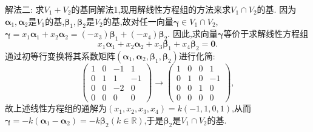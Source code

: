 \documentclass[../../main.tex]{subfiles}
\begin{document}
\begin{solution}
{\color{blue}解法二:} 求\(V_1 + V_2\)的基同解法1,现用解线性方程组的方法来求\(V_1\cap V_2\)的基. 因为\(\boldsymbol{\alpha}_1,\boldsymbol{\alpha}_2\)是\(V_1\)的基,\(\boldsymbol{\beta}_1,\boldsymbol{\beta}_2\)是\(V_2\)的基,故对任一向量\(\boldsymbol{\gamma}\in V_1\cap V_2\),\(\boldsymbol{\gamma}=x_1\boldsymbol{\alpha}_1 + x_2\boldsymbol{\alpha}_2=(-x_3)\boldsymbol{\beta}_1 + (-x_4)\boldsymbol{\beta}_2\). 因此,求向量\(\boldsymbol{\gamma}\)等价于求解线性方程组
\[
x_1\boldsymbol{\alpha}_1 + x_2\boldsymbol{\alpha}_2 + x_3\boldsymbol{\beta}_1 + x_4\boldsymbol{\beta}_2=\boldsymbol{0}.
\]
通过初等行变换将其系数矩阵\((\boldsymbol{\alpha}_1,\boldsymbol{\alpha}_2,\boldsymbol{\beta}_1,\boldsymbol{\beta}_2)\)进行化简:
\[
\begin{pmatrix}
1&0&-1&1\\
0&1&1&-1\\
0&0&-2&0\\
0&0&0&0
\end{pmatrix}\to
\begin{pmatrix}
1&0&0&1\\
0&1&0&-1\\
0&0&1&0\\
0&0&0&0
\end{pmatrix},
\]
故上述线性方程组的通解为\((x_1,x_2,x_3,x_4)=k(-1,1,0,1)\),从而\(\boldsymbol{\gamma}=-k(\boldsymbol{\alpha}_1 - \boldsymbol{\alpha}_2)=-k\boldsymbol{\beta}_2(k\in\mathbb{R})\),于是\(\boldsymbol{\beta}_2\)是\(V_1\cap V_2\)的基. 
\end{solution}
\end{document}
